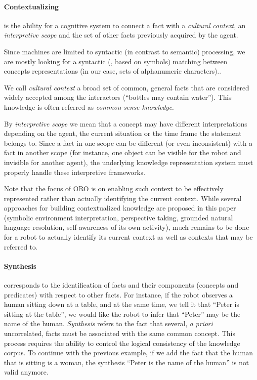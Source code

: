 \paragraph{Contextualizing} is the ability for a cognitive system to connect a
fact with a \emph{cultural context}, an \emph{interpretive scope} and the set
of other facts previously acquired by the agent.

Since machines are limited to syntactic (in contrast to semantic)
processing, we are mostly looking for a syntactic (\ie, based on symbols)
matching between concepts representations (in our case, sets of alphanumeric
characters)..

We call \textit{cultural context} a broad set of common, general facts that are
considered widely accepted among the interactors (\eg ``bottles may contain
water''). This knowledge is often referred as \emph{common-sense knowledge}.

By \emph{interpretive scope} we mean that a concept may have different
interpretations depending on the agent, the current situation or the time frame
the statement belongs to. Since a fact in one scope can be different (or even
inconsistent) with a fact in another scope (for instance, one object can be
visible for the robot and invisible for another agent), the underlying
knowledge representation system must properly handle these interpretive
frameworks.

Note that the focus of ORO is on enabling such context to be
effectively represented rather than actually identifying the current context.
While several approaches for building contextualized knowledge are proposed in this
paper (symbolic environment interpretation, perspective taking, grounded
natural language resolution, self-awareness of its own activity), much remains
to be done for a robot to actually identify its current context as well as
contexts that may be referred to.

\paragraph{Synthesis} corresponds to the identification of facts and their
components (concepts and predicates) with respect to other facts. For instance,
if the robot observes a human sitting down at a table, and at the same time, we
tell it that ``Peter is sitting at the table'', we would like the robot to
infer that ``Peter'' may be the name of the human. \textit{Synthesis}
refers to the fact that several, \textit{a priori} uncorrelated, facts
must be associated with the same common concept. This process requires the
ability to control the logical consistency of the knowledge corpus. To
continue with the previous example,  if we add the fact that the human that
is sitting is a woman, the synthesis ``Peter is the name of the human'' is
not valid anymore.

